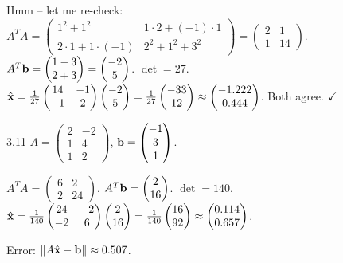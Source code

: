 \begin{solution}
Hmm -- let me re-check: $A^TA=\begin{pmatrix}1^2+1^2&1\cdot2+(-1)\cdot1\\2\cdot1+1\cdot(-1)&2^2+1^2+3^2\end{pmatrix}=\begin{pmatrix}2&1\\1&14\end{pmatrix}$. $A^T\mathbf{b}=\begin{pmatrix}1-3\\2+3\end{pmatrix}=\begin{pmatrix}-2\\5\end{pmatrix}$. $\det=27$. $\hat{\mathbf{x}}=\frac{1}{27}\begin{pmatrix}14&-1\\-1&2\end{pmatrix}\begin{pmatrix}-2\\5\end{pmatrix}=\frac{1}{27}\begin{pmatrix}-33\\12\end{pmatrix}\approx\begin{pmatrix}-1.222\\0.444\end{pmatrix}$.
Both agree. $\checkmark$
\end{solution}

\begin{exercise}{3.11}
$A=\begin{pmatrix}2&-2\\1&4\\1&2\end{pmatrix}$, $\mathbf{b}=\begin{pmatrix}-1\\3\\1\end{pmatrix}$.
\end{exercise}
\begin{solution}
$A^TA=\begin{pmatrix}6&2\\2&24\end{pmatrix}$, $A^T\mathbf{b}=\begin{pmatrix}2\\16\end{pmatrix}$. $\det=140$.
$\hat{\mathbf{x}}=\frac{1}{140}\begin{pmatrix}24&-2\\-2&6\end{pmatrix}\begin{pmatrix}2\\16\end{pmatrix}=\frac{1}{140}\begin{pmatrix}16\\92\end{pmatrix}\approx\begin{pmatrix}0.114\\0.657\end{pmatrix}$.

Error: $\left\|A\hat{\mathbf{x}}-\mathbf{b}\right\|\approx 0.507$.
\end{solution}

